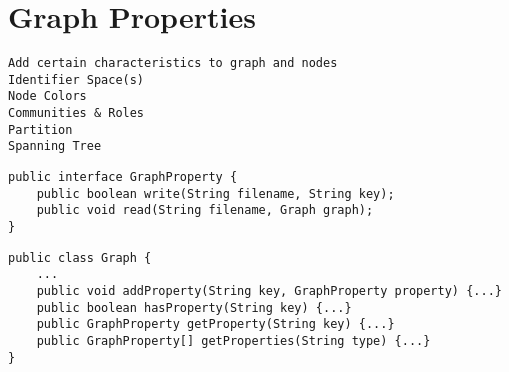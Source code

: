 
\section{Graph Properties}
\label{sec:graph-properties}


\begin{verbatim}
Add certain characteristics to graph and nodes
Identifier Space(s)
Node Colors
Communities & Roles
Partition
Spanning Tree
\end{verbatim}


\begin{lstlisting}[label={lst:graph-properties:interface},caption={GraphProperty interface}]
public interface GraphProperty {
	public boolean write(String filename, String key);
	public void read(String filename, Graph graph);
}
\end{lstlisting}



\begin{lstlisting}[label={lst:graph-properties:graph},caption={Graph methods for handling graph properties}]
public class Graph {
	...
	public void addProperty(String key, GraphProperty property) {...}
	public boolean hasProperty(String key) {...}
	public GraphProperty getProperty(String key) {...}
	public GraphProperty[] getProperties(String type) {...}
}
\end{lstlisting}

